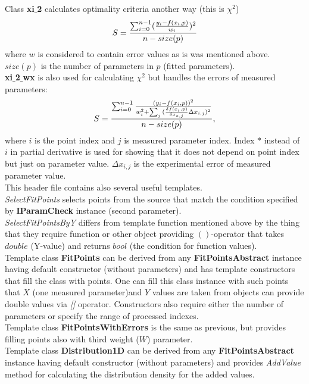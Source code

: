\documentclass[a4paper]{article}
\begin{document}
Class \textbf{xi$\_$2} calculates optimality criteria another way (this is $\chi^2$)
\begin{equation}\Large
S = \frac{\sum_{i=0}^{n-1}(\frac{y_i-f(x_i,p)}{w_i})^2}{n - size(p)}
\label{chi_2}
\end{equation}
where $w$ is considered to contain error values as is was mentioned above. $size(p)$ is the number of parameters in $p$ (fitted parameters).
\\
\textbf{xi$\_$2$\_$wx} is also used for calculating $\chi^2$ but handles the errors of measured parameters:
\begin{equation}\Large
S = \frac{\sum_{i=0}^{n-1}\frac{(y_i-f(x_i,p))^2}{w_i^2+\sum_j{(\frac{\delta f(x_i,p)}{\delta x_{*,j}}\Delta x_{i,j})^2}}}{n - size(p)},
\label{chi_2_ex}
\end{equation}
where $i$ is the point index and $j$ is measured parameter index.
Index $*$ instead of $i$ in partial derivative is used for showing that it does not depend on point index but just on parameter value.
$\Delta x_{i,j}$ is the experimental error of measured parameter value.\\
This header file contains also several useful templates.\\
\textit{SelectFitPoints} selects points from the source that match the condition specified by \textbf{IParamCheck} instance (second parameter).
\\
\textit{SelectFitPointsByY} differs from template function mentioned above by the thing that they require function or other object providing $()$-operator that takes $double$ (Y-value) and returns $bool$ (the condition for function values).
\\
Template class \textbf{FitPoints} can be derived from any \textbf{FitPointsAbstract} instance having default constructor (without parameters) and has template constructors that fill the class with points. 
One can fill this class instance with such points that $X$ (one measured parameter)and $Y$ values are taken from objects can provide double values via \textit{[]} operator.
Constructors also require either the number of parameters or specify the range of processed indexes.
\\
Template class \textbf{FitPointsWithErrors} is the same as previous, but provides filling points also with third weight ($W$) parameter.
\\
Template class \textbf{Distribution1D} can be derived from any \textbf{FitPointsAbstract} instance having default constructor (without parameters) and provides \textit{AddValue} method for calculating the distribution density for the added values.
\end{document}
